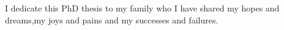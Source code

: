 
\begin{dedication} 

I dedicate this PhD thesis to my family who I have shared my hopes and dreams,\newline my joys and pains and my successes and failures.

\end{dedication}


